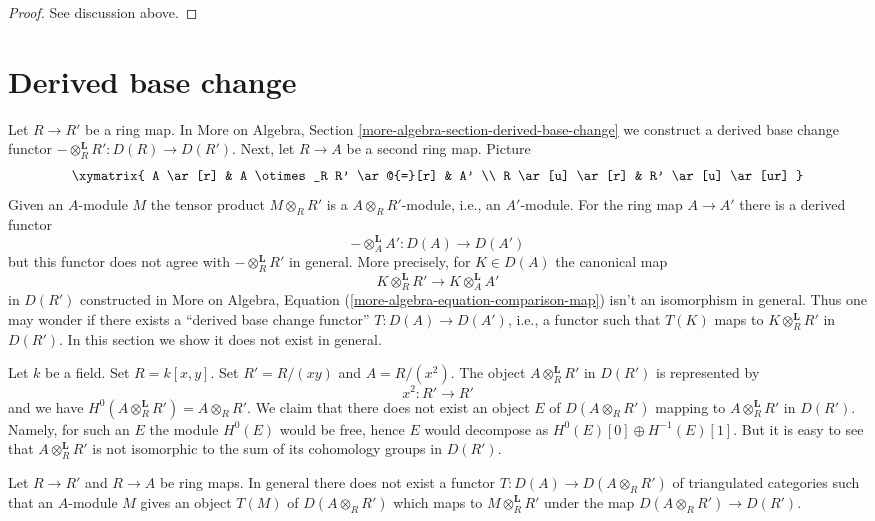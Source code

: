 \begin{proof}
See discussion above.
\end{proof}






\section{Derived base change}
\label{section-derived-base-change}

\noindent
Let $R \to R'$ be a ring map. In
More on Algebra, Section \ref{more-algebra-section-derived-base-change}
we construct a derived base change functor
$- \otimes_R^\mathbf{L} R' : D(R) \to D(R')$.
Next, let $R \to A$ be a second ring map. Picture
$$
\xymatrix{
	A \ar[r] & A \otimes_R R' \ar@{=}[r] & A' \\
R \ar[u] \ar[r] & R' \ar[u] \ar[ur]
}
$$
Given an $A$-module $M$ the tensor product $M \otimes_R R'$ is a
$A \otimes_R R'$-module, i.e., an $A'$-module. For the ring
map $A \to A'$ there is a derived functor
$$
- \otimes_A^\mathbf{L} A' : D(A) \longrightarrow D(A')
$$
but this functor does not agree with $- \otimes_R^\mathbf{L} R'$
in general. More precisely, for $K \in D(A)$ the canonical map
$$
K \otimes_R^{\mathbf{L}} R' \longrightarrow
K \otimes_A^{\mathbf{L}} A'
$$
in $D(R')$ constructed in
More on Algebra, Equation (\ref{more-algebra-equation-comparison-map})
isn't an isomorphism in general. Thus one may wonder if there exists a
``derived base change functor'' $T : D(A) \to D(A')$, i.e., a functor
such that $T(K)$ maps to $K \otimes_R^\mathbf{L} R'$ in $D(R')$.
In this section we show it does not exist in general.

\medskip\noindent
Let $k$ be a field. Set $R = k[x, y]$. Set $R' = R/(xy)$ and $A = R/(x^2)$.
The object $A \otimes_R^\mathbf{L} R'$ in $D(R')$ is represented by
$$
x^2 : R' \longrightarrow R'
$$
and we have $H^0(A \otimes_R^\mathbf{L} R') = A \otimes_R R'$. We claim that
there does not exist an object $E$ of $D(A \otimes_R R')$ mapping to
$A \otimes_R^\mathbf{L} R'$ in $D(R')$. Namely, for such an $E$ the module
$H^0(E)$ would be free, hence $E$ would decompose as
$H^0(E)[0] \oplus H^{-1}(E)[1]$. But it is easy to see that
$A \otimes_R^\mathbf{L} R'$ is not isomorphic to the sum of its
cohomology groups in $D(R')$.

\begin{lemma}
\label{lemma-no-derived-base-change}
Let $R \to R'$ and $R \to A$ be ring maps. In general there does not
exist a functor $T : D(A) \to D(A \otimes_R R')$
of triangulated categories such that an $A$-module $M$ gives an
object $T(M)$ of $D(A \otimes_R R')$ which maps to
$M \otimes_R^\mathbf{L} R'$ under the map $D(A \otimes_R R') \to D(R')$.
\end{lemma}

